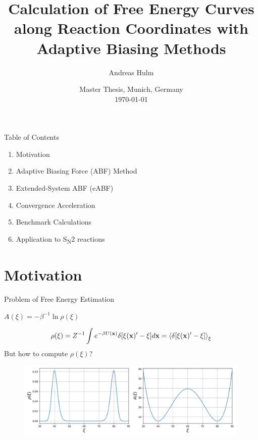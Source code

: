 \documentclass[10pt]{beamer}
\title[Adaptive Biasing Methods]{
    Calculation of Free Energy Curves along Reaction Coordinates with Adaptive Biasing Methods
}
\author[Andreas Hulm, 2021]{
    Andreas Hulm
}
\institute[LMU]{
    LMU Munich \\
    }
\date[Masterthesis, \today]{
    Master Thesis, Munich, Germany\\
    \today
}
\begin{document}
\begin{frame}
\titlepage
\end{frame}

\begin{frame}{Table of Contents}
    \begin{enumerate}
      \item Motivation
      \item Adaptive Biasing Force (ABF) Method
      \item Extended-System ABF (eABF)
      \item Convergence Acceleration
      \item Benchmark Calculations
      \item Application to S\textsubscript{N}2 reactions
    \end{enumerate}
\end{frame}

\section{Motivation}

\begin{frame}{Problem of Free Energy Estimation}
\begin{tcolorbox}[colback=green!5,colframe=green!40!black, title=Definition]
  $A(\xi)=-\beta^{-1}\ln\rho(\xi)$
\end{tcolorbox}
\begin{equation}
  \rho(\xi)=Z^{-1} \int e^{-\beta U(\textbf{x})} \delta[\xi(\textbf{x})'-\xi] d\textbf{x}=\braket{\delta [\xi(\textbf{x})'-\xi]}_\xi
\end{equation}
But how to compute $\rho(\xi)$?
\begin{figure}[H]
    \centering
    \includegraphics[width=0.99\textwidth]{bilder/talk/PvsA}
\end{figure}
\end{frame}
\end{document}
